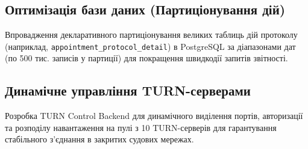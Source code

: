 \documentclass{article}
\begin{document}
\subsection{Оптимізація бази даних (Партиціонування дій)}
Впровадження декларативного партиціонування великих таблиць дій протоколу (наприклад,
\texttt{appointment\_protocol\_detail}) в PostgreSQL за діапазонами дат (по 500 тис.
записів у партиції) для покращення швидкодії запитів звітності.

\subsection{Динамічне управління TURN-серверами}
Розробка TURN Control Backend для динамічного виділення портів, авторизації та розподілу
навантаження на пулі з 10 TURN-серверів для гарантування стабільного з'єднання в закритих
судових мережах.
\end{document}
